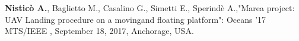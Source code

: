 
\begin{cventries}
  \vspace*{-10pt}
  \cventry
  {} %
  {} %
  {} %
  {} %
  {
    \begin{cvitems} %
    \item {\textbf{Nisticò A.}, Baglietto M., Casalino G., Simetti E., Sperindè A.,"Marea project: UAV Landing procedure on a movingand floating platform": Oceans ’17 MTS/IEEE , September 18, 2017, Anchorage, USA.}
    \end{cvitems}
  }

\end{cventries}
